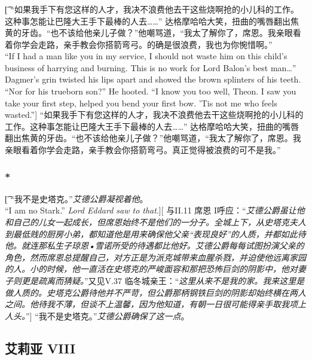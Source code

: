 \documentclass[12pt,a4paper]{article}
\begin{document}
\subsubsection{}\t[		
	“如果我手下有您这样的人才，我决不浪费他去干这些烧啊抢的小儿科的工作。这种事怎能让巴隆大王手下最棒的人去……”
	达格摩哈哈大笑，扭曲的嘴唇翻出焦黄的牙齿。“也不该给他亲儿子做？”他嘲骂道，“我太了解你了，席恩。我亲眼看着你学会走路，亲手教会你搭箭弯弓。的确是很浪费，我也为你惋惜啊。”\\
	“If I had a man like you in my service, I should not waste him on this child's business of harrying and burning. This is no work for Lord Balon's best man\ldots”
	Dagmer's grin twisted his lips apart and showed the brown splinters of his teeth. “Nor for his trueborn son?” He hooted. “I know you too well, Theon. I saw you take your first step, helped you bend your first bow. 'Tis not me who feels wasted.”]
	“如果我手下有您这样的人才，我决不浪费他去干这些烧啊抢的小儿科的工作。这种事怎能让巴隆大王手下最棒的人去……”
	达格摩哈哈大笑，扭曲的嘴唇翻出焦黄的牙齿。“也不该给他亲儿子做？”他嘲骂道，“我太了解你了，席恩。我亲眼看着你学会走路，亲手教会你搭箭弯弓。真正觉得被浪费的可不是我。”
	
\subsubsection{\color{red}*}\t[	
	 “我不是史塔克。”\emph{艾德公爵凝视着他}。\\
	 “I am no Stark.” \emph{Lord Eddard saw to that}.][
	 与II.11 席恩 I呼应：“\emph{艾德公爵虽让他和自己的儿女一起成长，但席恩始终不是他们的一分子。全城上下，从史塔克夫人到最低贱的厨房小弟，都知道他是用来确保他父亲“表现良好”的人质，并都如此待他。就连那私生子琼恩•雪诺所受的待遇都比他好。艾德公爵每每试图扮演父亲的角色，然而席恩总提醒自己，对方正是为派克城带来血腥杀戮，并迫使他远离家园的人。小的时候，他一直活在史塔克的严峻面容和那把恐怖巨剑的阴影中，他对妻子则更是疏离而猜疑。}”又见V.37 临冬城亲王：“\emph{这里从来不是我的家。我来这里是做人质的。史塔克公爵待他并不严苛，但公爵那柄钢铁巨剑的阴影却始终横在两人之间。他待我不薄，但谈不上温馨，因为他知道，有朝一日很可能得亲手取我项上人头。}”]
	 “我不是史塔克。”\emph{艾德公爵确保了这一点}。
	 

\subsection{艾莉亚 VIII}
\end{document}
